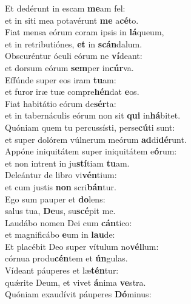 \evenverse Et dedérunt in escam \textbf{me}am fel:~\*\\
\evenverse et in siti mea potavérunt \textbf{me} a\textbf{cé}to.\\
\oddverse Fiat mensa eórum coram ipsis in \textbf{lá}queum,~\*\\
\oddverse et in retributiónes, \textbf{et} in \textbf{scán}dalum.\\
\evenverse Obscuréntur óculi eórum ne \textbf{ví}deant:~\*\\
\evenverse et dorsum eórum \textbf{sem}per in\textbf{cúr}va.\\
\oddverse Effúnde super eos iram \textbf{tu}am:~\*\\
\oddverse et furor iræ tuæ compre\textbf{hén}dat \textbf{e}os.\\
\evenverse Fiat habitátio eórum de\textbf{sér}ta:~\*\\
\evenverse et in tabernáculis eórum non sit \textbf{qui} in\textbf{há}bitet.\\
\oddverse Quóniam quem tu percussísti, perse\textbf{cú}ti sunt:~\*\\
\oddverse et super dolórem vúlnerum meórum \textbf{ad}di\textbf{dé}runt.\\
\evenverse Appóne iniquitátem super iniquitátem e\textbf{ó}rum:~\*\\
\evenverse et non intrent in ju\textbf{stí}tiam \textbf{tu}am.\\
\oddverse Deleántur de libro vi\textbf{vén}tium:~\*\\
\oddverse et cum justis \textbf{non} scri\textbf{bán}tur.\\
\evenverse Ego sum pauper et \textbf{do}lens:~\*\\
\evenverse salus tua, \textbf{De}us, su\textbf{scé}pit me.\\
\oddverse Laudábo nomen Dei cum \textbf{cán}tico:~\*\\
\oddverse et magnificábo \textbf{e}um in \textbf{lau}de:\\
\evenverse Et placébit Deo super vítulum no\textbf{vél}lum:~\*\\
\evenverse córnua produ\textbf{cén}tem et \textbf{ún}gulas.\\
\oddverse Vídeant páuperes et læ\textbf{tén}tur:~\*\\
\oddverse quǽrite Deum, et vivet \textbf{á}nima \textbf{ve}stra.\\
\evenverse Quóniam exaudívit páuperes \textbf{Dó}minus:~\*\\

